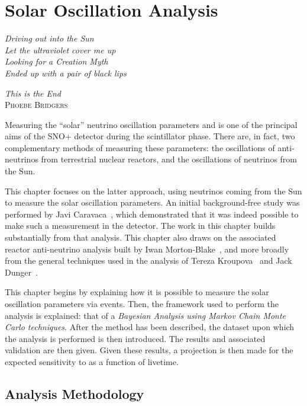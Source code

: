 \chapter{Solar Oscillation Analysis}\label{chap:solar_osc_analysis}
\epigraph{\textit{Driving out into the Sun\\Let the ultraviolet cover me up\\Looking for a Creation Myth\\Ended up with a pair of black lips}}{\textit{This is the End}\\ \textsc{Phoebe Bridgers}}
Measuring the ``solar'' neutrino oscillation parameters \dmsq{} and \tonetwo{} is one of the principal aims of the SNO+ detector during the scintillator phase. There are, in fact, two complementary methods of measuring these parameters: the oscillations of anti-neutrinos from terrestrial nuclear reactors, and the oscillations of neutrinos from the Sun.

This chapter focuses on the latter approach, using \beight{} neutrinos coming from the Sun to measure the solar oscillation parameters. An initial background-free study was performed by Javi Caravaca~\cite{caravacaSNOSensitivityStandard2020}, %
which demonstrated that it was indeed possible to make such a measurement in the detector. The work in this chapter builds substantially from that analysis. This chapter also draws on the associated reactor anti-neutrino analysis built by Iwan Morton-Blake~\cite{morton-blakeFirstMeasurementReactor2021}, %
and more broadly from the general techniques used in the \onbb{} analysis of Tereza Kroupova~\cite{kroupovaImprovingSensitivityNeutrinoless2020} and Jack Dunger~\cite{dungerTopologicalTimeBased2018}.%

This chapter begins by explaining how it is possible to measure the solar oscillation parameters via \beight{} events. Then, the framework used to perform the analysis is explained: that of a \textit{Bayesian Analysis using Markov Chain Monte Carlo techniques}. After the method has been described, the dataset upon which the analysis is performed is then introduced. The results and associated validation are then given. Given these results, a projection is then made for the expected sensitivity to \tonetwo{} as a function of livetime.


\section{Analysis Methodology}\label{sec:analysis_method}
